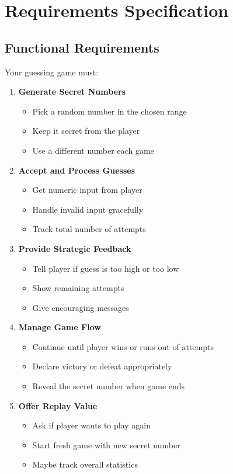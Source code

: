 \documentclass[
  letterpaper,
  DIV=11,
  numbers=noendperiod,
  oneside]{scrreprt}
\providecommand{\tightlist}{%
  \setlength{\itemsep}{0pt}\setlength{\parskip}{0pt}}\usepackage{longtable,booktabs,array}
\begin{document}
\section{Requirements Specification}\label{requirements-specification-2}

\subsection{Functional Requirements}\label{functional-requirements-2}

Your guessing game must:

\begin{enumerate}
\def\labelenumi{\arabic{enumi}.}
\tightlist
\item
  \textbf{Generate Secret Numbers}

  \begin{itemize}
  \tightlist
  \item
    Pick a random number in the chosen range
  \item
    Keep it secret from the player
  \item
    Use a different number each game
  \end{itemize}
\item
  \textbf{Accept and Process Guesses}

  \begin{itemize}
  \tightlist
  \item
    Get numeric input from player
  \item
    Handle invalid input gracefully
  \item
    Track total number of attempts
  \end{itemize}
\item
  \textbf{Provide Strategic Feedback}

  \begin{itemize}
  \tightlist
  \item
    Tell player if guess is too high or too low
  \item
    Show remaining attempts
  \item
    Give encouraging messages
  \end{itemize}
\item
  \textbf{Manage Game Flow}

  \begin{itemize}
  \tightlist
  \item
    Continue until player wins or runs out of attempts
  \item
    Declare victory or defeat appropriately
  \item
    Reveal the secret number when game ends
  \end{itemize}
\item
  \textbf{Offer Replay Value}

  \begin{itemize}
  \tightlist
  \item
    Ask if player wants to play again
  \item
    Start fresh game with new secret number
  \item
    Maybe track overall statistics
  \end{itemize}
\end{enumerate}
\end{document}
